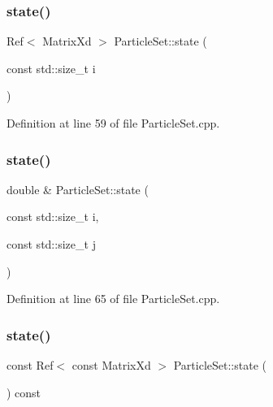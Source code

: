 \mbox{\label{classbfl_1_1ParticleSet_abac71061f890d8356bd83e69a07fd86b}} 
\subsubsection{\texorpdfstring{state()}{state()}\hspace{0.1cm}{\footnotesize\ttfamily [2/6]}}
{\footnotesize\ttfamily Ref$<$ Matrix\+Xd $>$ Particle\+Set\+::state (\begin{DoxyParamCaption}\item[{const std\+::size\+\_\+t}]{i }\end{DoxyParamCaption})}



Definition at line 59 of file Particle\+Set.\+cpp.

\mbox{\label{classbfl_1_1ParticleSet_a363c8f374c6708b347233ed70c3f678f}} 
\subsubsection{\texorpdfstring{state()}{state()}\hspace{0.1cm}{\footnotesize\ttfamily [3/6]}}
{\footnotesize\ttfamily double \& Particle\+Set\+::state (\begin{DoxyParamCaption}\item[{const std\+::size\+\_\+t}]{i,  }\item[{const std\+::size\+\_\+t}]{j }\end{DoxyParamCaption})}



Definition at line 65 of file Particle\+Set.\+cpp.

\mbox{\label{classbfl_1_1ParticleSet_a8f42ac3164fd761e75408c7f1a128b77}} 
\subsubsection{\texorpdfstring{state()}{state()}\hspace{0.1cm}{\footnotesize\ttfamily [4/6]}}
{\footnotesize\ttfamily const Ref$<$ const Matrix\+Xd $>$ Particle\+Set\+::state (\begin{DoxyParamCaption}{ }\end{DoxyParamCaption}) const}



